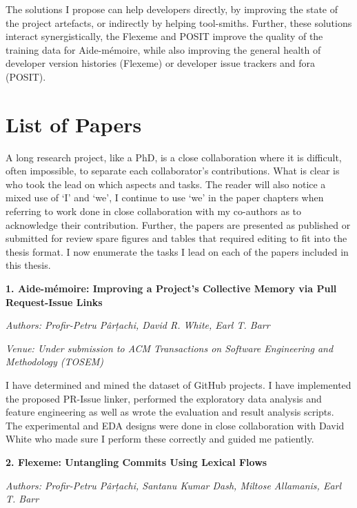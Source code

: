 The solutions I propose can help developers directly, by improving the state of
the project artefacts, or indirectly by helping tool-smiths. Further, these
solutions interact synergistically, the Flexeme and POSIT improve the quality of
the training data for Aide-mémoire, while also improving the general health of
developer version histories (Flexeme) or developer issue trackers and fora
(POSIT).

\section{List of Papers}
\label{chapter:introduction:sec:papers}


A long research project, like a PhD, is a close collaboration where it is
difficult, often impossible, to separate each collaborator's contributions. What
is clear is who took the lead on which aspects and tasks. The reader will also
notice a mixed use of `I' and `we', I continue to use `we' in the paper chapters
when referring to work done in close collaboration with my co-authors as to
acknowledge their contribution. Further, the papers are presented as published
or submitted for review spare figures and tables that required editing to fit
into the thesis format. I now enumerate the tasks I lead on each of the papers
included in this thesis.

\noindent\textbf{1. Aide-mémoire: Improving a Project’s Collective Memory via Pull
Request-Issue Links} 

\noindent\emph{Authors: Profir-Petru Pârțachi, David R. White, Earl T. Barr}

\noindent\emph{Venue: Under submission to ACM Transactions on Software
Engineering and Methodology (TOSEM)}

\noindent I have determined and mined the dataset of GitHub projects. I have
implemented the proposed PR-Issue linker, performed the exploratory data
analysis and feature engineering as well as wrote the evaluation and result
analysis scripts. The experimental and EDA designs were done in close
collaboration with David White who made sure I perform these correctly and
guided me patiently.

\noindent\textbf{2. Flexeme: Untangling Commits Using Lexical Flows}

\noindent\emph{Authors: Profir-Petru Pârțachi, Santanu Kumar Dash, Miltose
Allamanis, Earl T. Barr}

